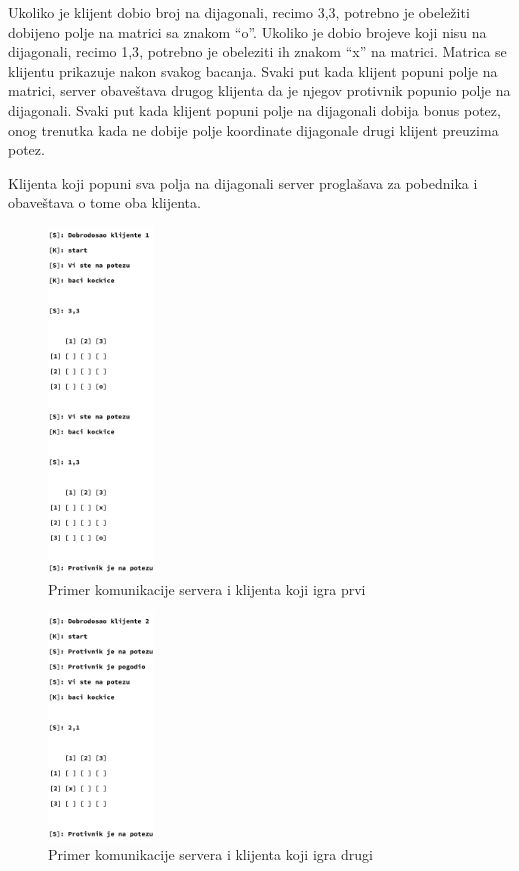Ukoliko je klijent dobio broj na dijagonali, recimo {3,3}, potrebno je obeležiti dobijeno polje na matrici sa znakom “o”. Ukoliko je dobio brojeve koji nisu na dijagonali, recimo {1,3}, potrebno je obeleziti ih znakom “x” na matrici. Matrica se klijentu prikazuje nakon svakog bacanja. Svaki put kada klijent popuni polje na matrici, server obaveštava drugog klijenta da je njegov protivnik popunio polje na dijagonali. Svaki put kada klijent popuni polje na dijagonali dobija bonus potez, onog trenutka kada ne dobije polje koordinate dijagonale drugi klijent preuzima potez.

Klijenta koji popuni sva polja na dijagonali server proglašava za pobednika i obaveštava o tome oba klijenta.

\begin{figure}[H]
    \centering
    \includegraphics[width=0.25\textwidth]{Slike/DM/DM_Igrac_prvi.png}
    \caption*{Primer komunikacije servera i klijenta koji igra prvi}
    \label{fig:dm_prvi}
\end{figure}

\begin{figure}[H]
    \centering
    \includegraphics[width=0.25\textwidth]{Slike/DM/DM_Igrac_drugi.png}
    \caption*{Primer komunikacije servera i klijenta koji igra drugi}
    \label{fig:dm_drugi}
\end{figure}